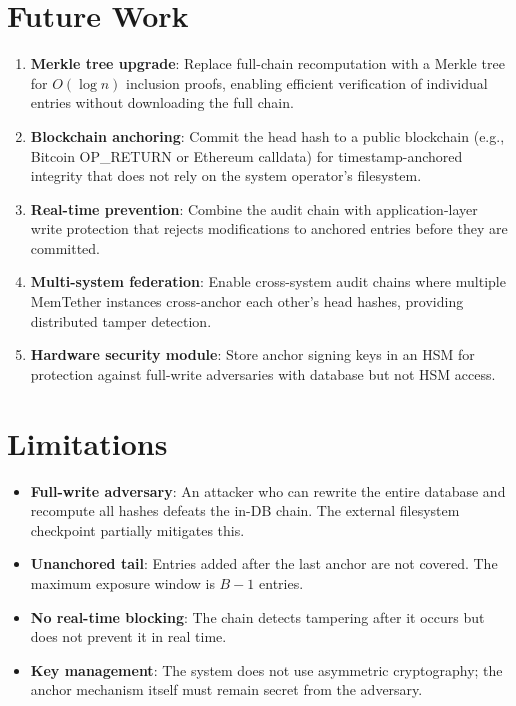 \documentclass[sigconf,nonacm]{acmart}
\begin{document}
\section{Future Work}

\begin{enumerate}
\item \textbf{Merkle tree upgrade}: Replace full-chain recomputation with a Merkle tree for $O(\log n)$ inclusion proofs, enabling efficient verification of individual entries without downloading the full chain.
\item \textbf{Blockchain anchoring}: Commit the head hash to a public blockchain (e.g., Bitcoin OP\_RETURN or Ethereum calldata) for timestamp-anchored integrity that does not rely on the system operator's filesystem.
\item \textbf{Real-time prevention}: Combine the audit chain with application-layer write protection that rejects modifications to anchored entries before they are committed.
\item \textbf{Multi-system federation}: Enable cross-system audit chains where multiple MemTether instances cross-anchor each other's head hashes, providing distributed tamper detection.
\item \textbf{Hardware security module}: Store anchor signing keys in an HSM for protection against full-write adversaries with database but not HSM access.
\end{enumerate}

\section{Limitations}

\begin{itemize}
\item \textbf{Full-write adversary}: An attacker who can rewrite the entire database and recompute all hashes defeats the in-DB chain. The external filesystem checkpoint partially mitigates this.
\item \textbf{Unanchored tail}: Entries added after the last anchor are not covered. The maximum exposure window is $B-1$ entries.
\item \textbf{No real-time blocking}: The chain detects tampering after it occurs but does not prevent it in real time.
\item \textbf{Key management}: The system does not use asymmetric cryptography; the anchor mechanism itself must remain secret from the adversary.
\end{itemize}
\end{document}
